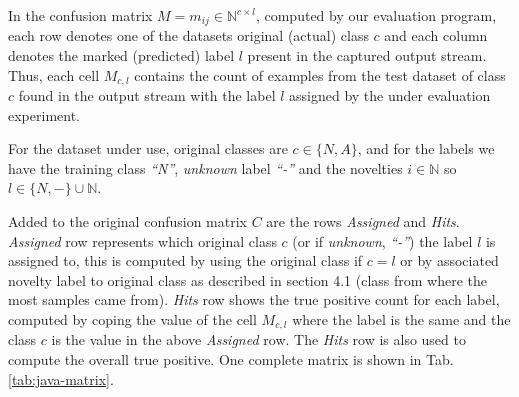In the confusion matrix $M = m_{ij} \in \mathbb{N} ^{c \times{} l}$, computed by
our evaluation program, each row denotes one of the datasets original (actual)
class $c$ and each column denotes the marked (predicted) label $l$ present in
the captured output stream.
Thus, each cell $M_{c, l}$ contains the count of examples from the test dataset
of class $c$ found in the output stream with the label $l$ assigned by the under
evaluation experiment.

For the dataset under use, original classes are $c \in \{N, A\}$, and for the
labels we have the training class
\emph{``N''}, \emph{unknown} label \emph{``-''} and the novelties $i \in
\mathbb{N}$ so $l \in \{N, -\} \cup \mathbb{N}$.

Added to the original confusion matrix $C$ are the rows \emph{Assigned} and
\emph{Hits}.
\emph{Assigned} row represents which original class $c$ (or if \emph{unknown},
\emph{``-''}) the label $l$ is assigned to, this is computed by using the
original class if $c = l$ or by associated novelty label to original class as
described in \cite{DeFaria2015evaluation} section 4.1
(class from where the most samples came from).
\emph{Hits} row shows the true positive count for each label,
computed by coping the value of the cell $M_{c, l}$ where the label is the same
and the class $c$ is the value in the above \emph{Assigned} row.
The \emph{Hits} row is also used to compute the overall true positive.
One complete matrix is shown in Tab. \ref{tab:java-matrix}.

%   

